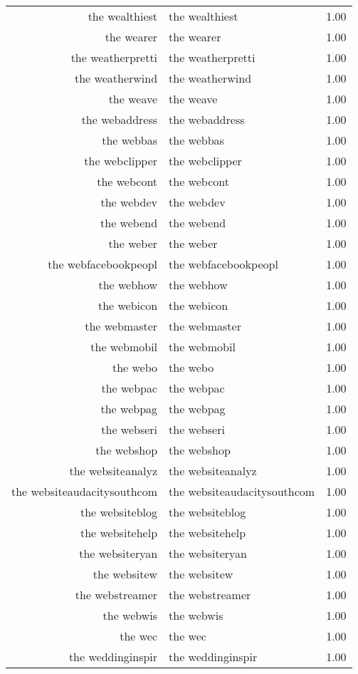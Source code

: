 \begin{table}[ht]
\begin{tabular}{rlr}
  the wealthiest & the wealthiest & 1.00 \\ 
  the wearer & the wearer & 1.00 \\ 
  the weatherpretti & the weatherpretti & 1.00 \\ 
  the weatherwind & the weatherwind & 1.00 \\ 
  the weave & the weave & 1.00 \\ 
  the webaddress & the webaddress & 1.00 \\ 
  the webbas & the webbas & 1.00 \\ 
  the webclipper & the webclipper & 1.00 \\ 
  the webcont & the webcont & 1.00 \\ 
  the webdev & the webdev & 1.00 \\ 
  the webend & the webend & 1.00 \\ 
  the weber & the weber & 1.00 \\ 
  the webfacebookpeopl & the webfacebookpeopl & 1.00 \\ 
  the webhow & the webhow & 1.00 \\ 
  the webicon & the webicon & 1.00 \\ 
  the webmaster & the webmaster & 1.00 \\ 
  the webmobil & the webmobil & 1.00 \\ 
  the webo & the webo & 1.00 \\ 
  the webpac & the webpac & 1.00 \\ 
  the webpag & the webpag & 1.00 \\ 
  the webseri & the webseri & 1.00 \\ 
  the webshop & the webshop & 1.00 \\ 
  the websiteanalyz & the websiteanalyz & 1.00 \\ 
  the websiteaudacitysouthcom & the websiteaudacitysouthcom & 1.00 \\ 
  the websiteblog & the websiteblog & 1.00 \\ 
  the websitehelp & the websitehelp & 1.00 \\ 
  the websiteryan & the websiteryan & 1.00 \\ 
  the websitew & the websitew & 1.00 \\ 
  the webstreamer & the webstreamer & 1.00 \\ 
  the webwis & the webwis & 1.00 \\ 
  the wec & the wec & 1.00 \\ 
  the weddinginspir & the weddinginspir & 1.00 \\ 

\end{tabular}
\end{table}
